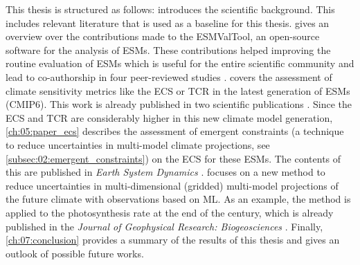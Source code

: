 This thesis is structured as follows: 
introduces the scientific background. This includes relevant literature that is
used as a baseline for this thesis.  gives an overview
over the contributions made to the \ac{ESMValTool}, an open-source software for
the analysis of \acp{ESM}. These contributions helped improving the routine
evaluation of \acp{ESM} which is useful for the entire scientific community and
lead to co-authorship in four peer-reviewed studies \autocite{Eyring2020,
  Lauer2020, Righi2020, Weigel2020}. 
covers the assessment of climate sensitivity metrics like the \ac{ECS} or
\ac{TCR} in the latest generation of \acp{ESM} (\acs{CMIP}6). This work is
already published in two scientific publications \autocite{Bock2020,
  Meehl2020}. Since the \ac{ECS} and \ac{TCR} are considerably higher in this
new climate model generation, \cref{ch:05:paper_ecs} describes the assessment
of emergent constraints (a technique to reduce uncertainties in multi-model
climate projections, see \cref{subsec:02:emergent_constraints}) on the \ac{ECS}
for these \acp{ESM}. The contents of this  are
published in \emph{Earth System Dynamics} \autocite{Schlund2020a}.
 focuses on a new method to reduce uncertainties in
multi-dimensional (gridded) multi-model projections of the future climate with
observations based on \ac{ML}. As an example, the method is applied to the
photosynthesis rate at the end of the  century, which is already
published in the \emph{Journal of Geophysical Research: Biogeosciences}
\autocite{Schlund2020}. Finally, \cref{ch:07:conclusion} provides a summary of
the results of this thesis and gives an outlook of possible future works.
